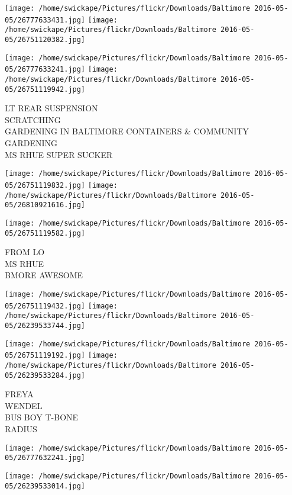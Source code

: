 \documentclass[10pt,letterpaper]{article}
\begin{document}
\texttt{[image: /home/swickape/Pictures/flickr/Downloads/Baltimore 2016-05-05/26777633431.jpg]}
\texttt{[image: /home/swickape/Pictures/flickr/Downloads/Baltimore 2016-05-05/26751120382.jpg]}

\texttt{[image: /home/swickape/Pictures/flickr/Downloads/Baltimore 2016-05-05/26777633241.jpg]}
\texttt{[image: /home/swickape/Pictures/flickr/Downloads/Baltimore 2016-05-05/26751119942.jpg]}

LT REAR SUSPENSION\\
SCRATCHING\\
GARDENING IN BALTIMORE CONTAINERS \& COMMUNITY GARDENING\\
MS RHUE SUPER SUCKER\\
\pagebreak

\texttt{[image: /home/swickape/Pictures/flickr/Downloads/Baltimore 2016-05-05/26751119832.jpg]}
\texttt{[image: /home/swickape/Pictures/flickr/Downloads/Baltimore 2016-05-05/26810921616.jpg]}

\vspace{0.25in}
\texttt{[image: /home/swickape/Pictures/flickr/Downloads/Baltimore 2016-05-05/26751119582.jpg]}

FROM LO\\
MS RHUE\\
BMORE AWESOME\\
\pagebreak

\texttt{[image: /home/swickape/Pictures/flickr/Downloads/Baltimore 2016-05-05/26751119432.jpg]}
\texttt{[image: /home/swickape/Pictures/flickr/Downloads/Baltimore 2016-05-05/26239533744.jpg]}

\texttt{[image: /home/swickape/Pictures/flickr/Downloads/Baltimore 2016-05-05/26751119192.jpg]}
\texttt{[image: /home/swickape/Pictures/flickr/Downloads/Baltimore 2016-05-05/26239533284.jpg]}

FREYA\\
WENDEL\\
BUS BOY T{-}BONE\\
RADIUS\\
\pagebreak

\texttt{[image: /home/swickape/Pictures/flickr/Downloads/Baltimore 2016-05-05/26777632241.jpg]}

\vspace{0.25in}
\texttt{[image: /home/swickape/Pictures/flickr/Downloads/Baltimore 2016-05-05/26239533014.jpg]}
\end{document}
